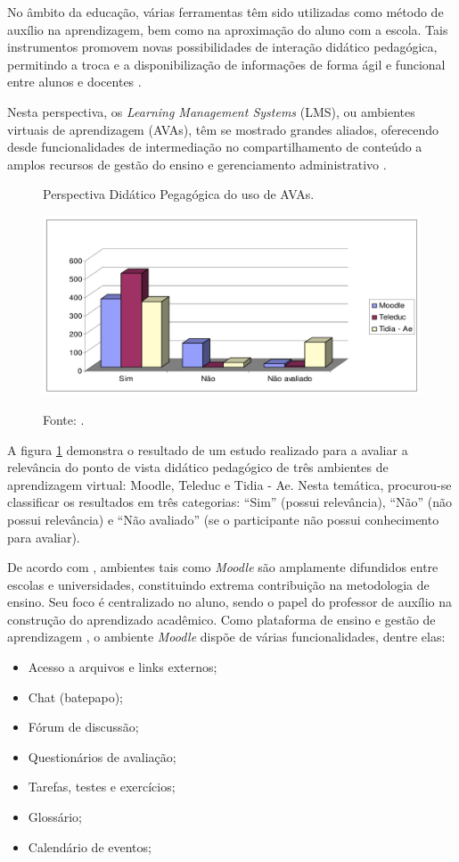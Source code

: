No âmbito da educação, várias ferramentas têm sido utilizadas como método de auxílio na aprendizagem, bem como na aproximação do aluno com a escola. Tais instrumentos promovem novas possibilidades de interação didático pedagógica, permitindo a troca e a disponibilização de informações de forma ágil e funcional entre alunos e docentes \cite{franciscato2008avaliaccao}.

Nesta perspectiva, os \textit{Learning Management Systems} (LMS), ou ambientes virtuais de aprendizagem (AVAs), têm se mostrado grandes aliados, oferecendo desde funcionalidades de intermediação no compartilhamento de conteúdo a amplos recursos de gestão do ensino e gerenciamento administrativo \cite{tori2018educaccao}.

\begin{figure}[h]
	\caption{Perspectiva Didático Pegagógica do uso de AVAs.}
	\centering %
	\includegraphics[width=15cm]{resources/grafico1.png} %
	\label{figura:perspectiva}	
	\caption*{Fonte: .}
\end{figure}

A figura \ref{figura:perspectiva} demonstra o resultado de um estudo realizado para a avaliar a relevância do ponto de vista didático pedagógico de três ambientes de aprendizagem virtual: Moodle, Teleduc e Tidia - Ae. Nesta temática, procurou-se classificar os resultados em três categorias: ``Sim'' (possui relevância), ``Não'' (não possui relevância) e ``Não avaliado'' (se o participante não possui conhecimento para avaliar).

De acordo com , ambientes tais como \textit{Moodle} são amplamente difundidos entre escolas e universidades, constituindo extrema contribuição na metodologia de ensino. Seu foco é centralizado no aluno, sendo o papel do professor de auxílio na construção do aprendizado acadêmico. Como plataforma de ensino e gestão de aprendizagem \cite{legoinha2006moodle}, o ambiente \textit{Moodle} dispõe de várias funcionalidades, dentre elas:
\begin{itemize}
	\item Acesso a arquivos e links externos;
	\item Chat (batepapo);
	\item Fórum de discussão;
	\item Questionários de avaliação;
	\item Tarefas, testes e exercícios;
	\item Glossário;
	\item Calendário de eventos;
\end{itemize}

